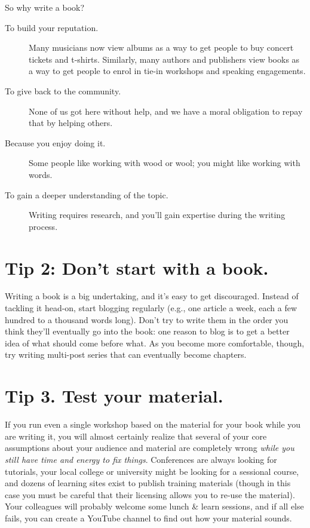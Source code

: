 \documentclass[10pt,letterpaper]{article}
\begin{document}
So why write a book?

\begin{description}

\item[To build your reputation.]
  Many musicians now view albums as a way to get people to buy concert tickets and t-shirts.
  Similarly, many authors and publishers view books as a way to get people
  to enrol in tie-in workshops and speaking engagements.
  
\item[To give back to the community.]
  None of us got here without help,
  and we have a moral obligation to repay that by helping others.
  
\item[Because you enjoy doing it.]
  Some people like working with wood or wool;
  you might like working with words.
  
\item[To gain a deeper understanding of the topic.]
  Writing requires research,
  and you'll gain expertise during the writing process.
  
\end{description}

\section*{Tip 2: Don't start with a book.}

Writing a book is a big undertaking, and it's easy to get discouraged.
Instead of tackling it head-on,
start blogging regularly
(e.g.,
one article a week, each a few hundred to a thousand words long).
Don't try to write them in the order you think they'll eventually go into the book:
one reason to blog is to get a better idea of what should come before what.
As you become more comfortable,
though,
try writing multi-post series that can eventually become chapters.

\section*{Tip 3. Test your material.}

If you run even a single workshop based on the material for your book
while you are writing it,
you will almost certainly realize that
several of your core assumptions about your audience and material are completely wrong
\emph{while you still have time and energy to fix things}.
Conferences are always looking for tutorials,
your local college or university might be looking for a sessional course,
and dozens of learning sites exist to publish training materials
(though in this case you must be careful that
their licensing allows you to re-use the material).
Your colleagues will probably welcome some lunch \& learn sessions,
and if all else fails,
you can create a YouTube channel to find out how your material sounds.
\end{document}
